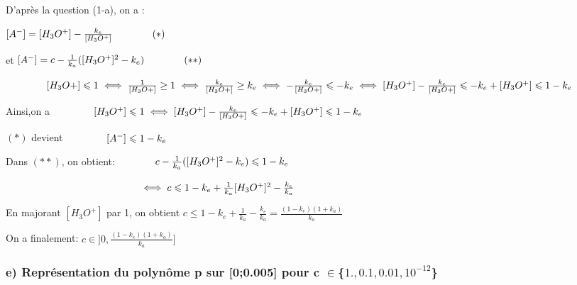 \documentclass[11pt]{article}
\begin{document}
D'après la question (1-a), on a :

\([A^-]=[H_3O^+]-\frac{k_e}{[H_3O^+]} \hspace{40px}(*)\)

et \([A^-]=c-\frac{1}{k_a}([H_3O^+]^2-k_e)\hspace{40px}(**)\)

\(\hspace{40px}[H_3O+]\leqslant 1 \iff \frac{1}{[H_3O+]}\geq 1 \iff \frac{k_e}{[H_3O+]}\geq k_e \iff -\frac{k_e}{[H_3O+]}\leqslant -k_e \iff [H_3O^+]-\frac{k_e}{[H_3O+]}\leqslant -k_e+[H_3O^+]\leqslant 1-k_e\)

Ainsi,on a
\(\hspace{40px}[H_3O^+]\leqslant 1 \iff [H_3O^+]-\frac{k_e}{[H_3O+]}\leqslant -k_e+[H_3O^+]\leqslant 1-k_e\)

\((*)\) devient \(\hspace{40px}[A^-]\leqslant 1-k_e\)

Dans \((**)\), on
obtient:\(\hspace{40px}c-\frac{1}{k_a}([H_3O^+]^2-k_e)\leqslant 1-k_e\)

\(\hspace{135px}\iff c\leqslant 1-k_e+\frac{1}{k_a}[H_3O^+]^2-\frac{k_e}{k_a}\)

En majorant \([H_3O^+]\) par 1, on obtient
\(c\leqslant 1-k_e+\frac{1}{k_a}-\frac{k_e}{k_a}=\frac{(1-k_e)(1+k_a)}{k_a}\)

On a finalement: \textbf{\(c \in ]0,\frac{(1-k_e)(1+k_a)}{k_a}]\)}

    \hypertarget{e-repruxe9sentation-du-polynuxf4me-p-sur-00.005-pour-c-in1.-0.10.0110-12}{%
\subsubsection{\texorpdfstring{\textbf{e) Représentation du polynôme p
sur {[}0;0.005{]} pour c
\(\in\)\{\({1., 0.1,0.01,10^{-12}}\)\}}}{e) Représentation du polynôme p sur {[}0;0.005{]} pour c \textbackslash{}in\{\{1., 0.1,0.01,10\^{}\{-12\}\}\}}}\label{e-repruxe9sentation-du-polynuxf4me-p-sur-00.005-pour-c-in1.-0.10.0110-12}}
\end{document}
